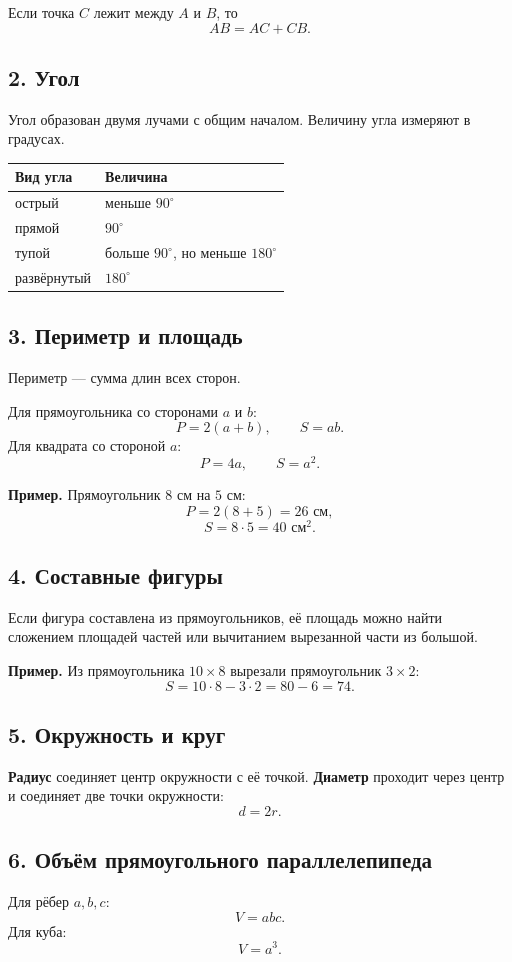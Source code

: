 \documentclass[12pt,a4paper]{article}
\newcommand{\term}[1]{\textbf{\textcolor{graphite}{#1}}}
\begin{document}
Если точка $C$ лежит между $A$ и $B$, то
\[
AB=AC+CB.
\]

\subsection*{2. Угол}
Угол образован двумя лучами с общим началом. Величину угла измеряют в градусах.

\begin{center}
\begin{tabular}{@{}ll@{}}
\toprule
Вид угла & Величина \\
\midrule
острый & меньше $90^\circ$ \\
прямой & $90^\circ$ \\
тупой & больше $90^\circ$, но меньше $180^\circ$ \\
развёрнутый & $180^\circ$ \\
\bottomrule
\end{tabular}
\end{center}

\subsection*{3. Периметр и площадь}
Периметр --- сумма длин всех сторон.

Для прямоугольника со сторонами $a$ и $b$:
\[
P=2(a+b),\qquad S=ab.
\]
Для квадрата со стороной $a$:
\[
P=4a,\qquad S=a^2.
\]

\textbf{Пример.} Прямоугольник $8$ см на $5$ см:
\[
P=2(8+5)=26\text{ см},
\]
\[
S=8\cdot5=40\text{ см}^2.
\]

\subsection*{4. Составные фигуры}
Если фигура составлена из прямоугольников, её площадь можно найти сложением площадей частей или вычитанием вырезанной части из большой.

\textbf{Пример.} Из прямоугольника $10\times8$ вырезали прямоугольник $3\times2$:
\[
S=10\cdot8-3\cdot2=80-6=74.
\]

\subsection*{5. Окружность и круг}
\term{Радиус} соединяет центр окружности с её точкой. \term{Диаметр} проходит через центр и соединяет две точки окружности:
\[
d=2r.
\]

\subsection*{6. Объём прямоугольного параллелепипеда}
Для рёбер $a,b,c$:
\[
V=abc.
\]
Для куба:
\[
V=a^3.
\]
\end{document}
